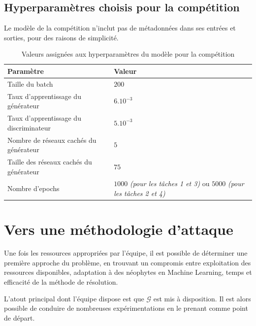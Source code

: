         \subsection{Hyperparamètres choisis pour la compétition}
            \begin{tcolorbox}[colback=linkborder_Color!5!white,colframe=linkborder_Color!75!black]
                Le modèle de la compétition n'inclut pas de métadonnées dans ses entrées et sorties, pour des raisons de simplicité.
            \end{tcolorbox}
                \begin{table}[H]
                    \centering
                    \begin{tabular}{p{}|p{}} \toprule
                        \textbf{Paramètre} & Valeur \\
                        \midrule
                            Taille du batch & $200$ \\
                            Taux d'apprentissage du générateur & $6.10^{-3}$ \\
                            Taux d'apprentissage du discriminateur & $5.10^{-3}$ \\
                            Nombre de réseaux cachés du générateur & $5$\\
                            Taille des réseaux cachés du générateur & $75$ \\
                            Nombre d'epochs & $1000$ \textit{(pour les tâches 1 et 3)} ou $5000$
                    \textit{(pour les tâches 2 et 4)} \\
                        \bottomrule
                    \end{tabular}
                    \caption{Valeurs assignées aux hyperparamètres du modèle pour la compétition}
                    \label{tabDopel:}
                \end{table}
    \newpage\section{Vers une méthodologie d'attaque}

        Une fois les ressources appropriées par l'équipe, il est possible de déterminer une première approche du problème, en trouvant un compromis entre exploitation des ressources disponibles,
        adaptation à des néophytes en Machine Learning, temps et efficacité de la méthode de résolution.

        L'atout principal dont l'équipe dispose est que $\mathcal G$ est mis à disposition. Il est
        alors possible de conduire de nombreuses expérimentations en le prenant comme point de départ.

